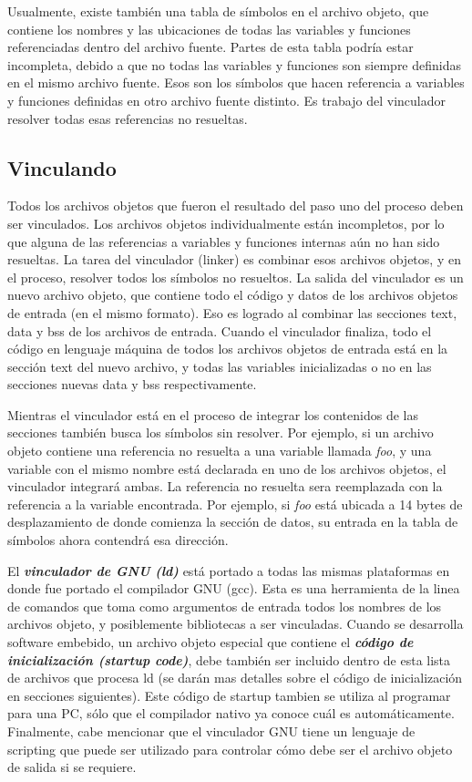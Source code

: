 \documentclass[output=paper, 
colorlinks,
citecolor=brown,
newtxmath
]{langscibook}
\begin{document}
Usualmente, existe también una tabla de símbolos en el archivo objeto, que contiene
los nombres y las ubicaciones de todas las variables y funciones referenciadas dentro
del archivo fuente. Partes de esta tabla podría estar incompleta, debido a que
no todas las variables y funciones son siempre definidas en el mismo archivo fuente. 
Esos son los símbolos que hacen referencia a variables y funciones definidas en 
otro archivo fuente distinto. Es trabajo del vinculador resolver todas esas referencias
no resueltas.

\subsection {Vinculando}

Todos los archivos objetos que fueron el resultado del paso uno del proceso deben
ser vinculados. Los archivos objetos individualmente están incompletos, por lo que
alguna de las referencias a variables y funciones internas aún no han sido resueltas.
La tarea del vinculador (linker) es combinar esos archivos objetos, y en el proceso,
resolver todos los símbolos no resueltos. La salida del vinculador es un nuevo archivo objeto, que contiene todo el código y datos
de los archivos objetos de entrada (en el mismo formato).
Eso es logrado al combinar las secciones text, data y bss de los archivos de entrada.
Cuando el vinculador finaliza, todo el código en lenguaje máquina de todos los archivos
objetos de entrada está en la sección text del nuevo archivo, y todas las variables
inicializadas o no en las secciones nuevas data y bss respectivamente.

Mientras el vinculador está en el proceso de integrar 
los contenidos de las secciones también 
busca los símbolos sin resolver. Por ejemplo, si un archivo objeto contiene 
una referencia no resuelta a  una variable llamada \textit{foo}, y una variable con 
el mismo nombre está declarada en uno de los archivos objetos, el vinculador
integrará ambas. La referencia no resuelta sera reemplazada con la referencia
a la variable encontrada. Por ejemplo, si \textit{foo} está ubicada a 14 bytes de desplazamiento
de donde comienza la sección de datos, su entrada en la tabla de símbolos ahora
contendrá esa dirección.

El \textit{\textbf{vinculador de GNU (ld)}} está portado a todas las mismas plataformas en donde
fue portado el compilador GNU (gcc). Esta es una herramienta de la linea de comandos
que toma como argumentos de entrada todos los nombres de los archivos objeto, 
y posiblemente bibliotecas a ser vinculadas.
Cuando se desarrolla software embebido, un archivo objeto especial que contiene el \textit{\textbf{código de 
inicialización (startup code)}}, debe también ser incluido dentro de esta
lista de archivos que procesa ld (se darán mas detalles sobre el código
de inicialización en secciones siguientes). Este código de startup
tambien se utiliza al programar para una PC, sólo que el compilador nativo
ya conoce cuál es automáticamente. Finalmente, cabe mencionar
que el vinculador GNU tiene un lenguaje de scripting que puede ser utilizado
para controlar cómo debe ser el archivo objeto de salida si se requiere.
\end{document}
